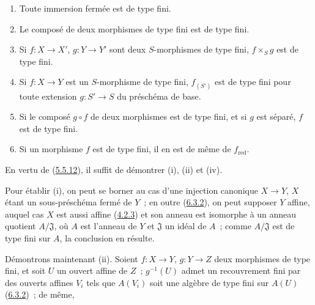\begin{proposition}[6.3.4]
\label{I.6.3.4-fr}
\begin{enumerate}
  \item[(i)] Toute immersion fermée est de type fini.
  \item[(ii)] Le composé de deux morphismes de type fini est de type fini.
  \item[(iii)] Si $f:X\to X'$, $g:Y\to Y'$ sont deux $S$-morphismes de type
    fini, $f\times_S g$ est de type fini.
  \item[(iv)] Si $f:X\to Y$ est un $S$-morphisme de type fini, $f_{(S')}$ est
    de type fini pour toute extension $g:S'\to S$ du préschéma de base.
  \item[(v)] Si le composé $g\circ f$ de deux morphismes est de type fini, et
    si $g$ est séparé, $f$ est de type fini.
  \item[(vi)] Si un morphisme $f$ est de type fini, il en est de même de
    $f_{\mathrm{red}}$.
\end{enumerate}
\end{proposition}

En vertu de (\hyperref[I.5.5.12-fr]{5.5.12}), il suffit de démontrer (i),
(ii) et (iv).

Pour établir (i), on peut se borner au cas d'une injection canonique
$X\to Y$, $X$ étant un sous-préschéma fermé de $Y$~; en outre
(\hyperref[I.6.3.2-fr]{6.3.2}), on peut supposer $Y$ affine, auquel cas $X$
est aussi affine (\hyperref[I.4.2.3-fr]{4.2.3}) et son anneau est isomorphe à
un anneau quotient $A/\mathfrak{J}$, où $A$ est l'anneau de $Y$ et
$\mathfrak{J}$ un idéal de $A$~; comme $A/\mathfrak{J}$ est de type fini sur
$A$, la conclusion en résulte.

Démontrons maintenant (ii). Soient $f:X\to Y$, $g:Y\to Z$ deux morphismes de
type fini, et soit $U$ un ouvert affine de $Z$~; $g^{-1}(U)$ admet un
recouvrement fini par des ouverts affines $V_i$ tels que $A(V_i)$ soit une
algèbre de type fini sur $A(U)$ (\hyperref[I.6.3.2-fr]{6.3.2})~; de même,

